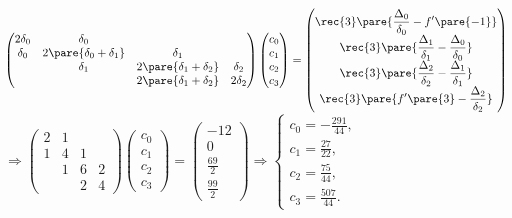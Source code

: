 \documentclass[hidelinks]{ctexart}
\begin{document}
$\displaystyle \begin{pmatrix}
    2\delta_0 & \delta_0 & & \\
    \delta_0 & 2\pare{\delta_0+\delta_1} & \delta_1 & \\
    & \delta_1 & 2\pare{\delta_1+\delta_2} & \delta_2 \\
    & & 2\pare{\delta_1 + \delta_2} & 2\delta_2
\end{pmatrix} \begin{pmatrix}
    c_0 \\ c_1 \\ c_2 \\ c_3
\end{pmatrix} = \begin{pmatrix}
    \displaystyle \rec{3}\pare{\frac{\Delta_0}{\delta_0} - f'\pare{-1}} \\
    \displaystyle \rec{3}\pare{\frac{\Delta_1}{\delta_1} - \frac{\Delta_0}{\delta_0}} \\
    \displaystyle \rec{3}\pare{\frac{\Delta_2}{\delta_2} - \frac{\Delta_1}{\delta_1}} \\
    \displaystyle \rec{3}\pare{f'\pare{3} - \frac{\Delta_2}{\delta_2}}
\end{pmatrix}$ \\
$\displaystyle \Rightarrow \begin{pmatrix}
    2 & 1 & & \\
    1 & 4 & 1 & \\
    & 1 & 6 & 2 \\
    & & 2 & 4
\end{pmatrix} \begin{pmatrix}
    c_0 \\ c_1 \\ c_2 \\ c_3
\end{pmatrix} = \begin{pmatrix}
    -12 \\
    0 \\
    \displaystyle \frac{69}{2} \\[.5em]
    \displaystyle \frac{99}{2}
\end{pmatrix} \Rightarrow \begin{cases}
    \displaystyle c_0 = -\frac{291}{44}, \\[.5em]
    \displaystyle c_1 = \frac{27}{22}, \\[.5em]
    \displaystyle c_2 = \frac{75}{44}, \\[.5em]
    \displaystyle c_3 = \frac{507}{44}.
\end{cases}$ \\
\end{document}
